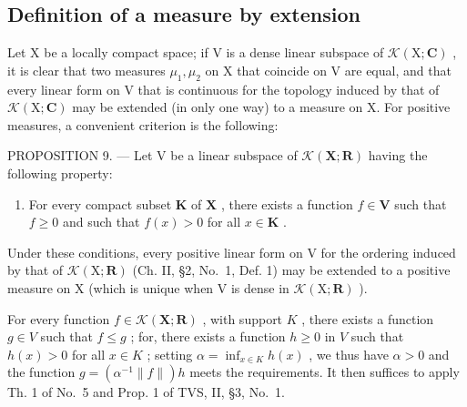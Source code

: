 \subsection{Definition of a measure by extension}

Let X be a locally compact space; if V is a dense linear subspace of \(\mathcal{K}(\mathrm{X};\mathbf{C})\) , it is clear that two measures \(\mu_{1}, \mu_{2}\) on X that coincide on V are equal, and that every linear form on V that is continuous for the topology induced by that of \(\mathcal{K}(\mathrm{X};\mathbf{C})\) may be extended (in only one way) to a measure on X. For positive measures, a convenient criterion is the following:

PROPOSITION 9. --- Let V be a linear subspace of \(\mathcal{K}(\mathbf{X};\mathbf{R})\) having the following property:

\begin{enumerate}
\def\labelenumi{(\Alph{enumi})}
\setcounter{enumi}{15}
\tightlist
\item
  For every compact subset \(\mathbf{K}\) of \(\mathbf{X}\) , there exists a function \(f \in \mathbf{V}\) such that \(f \geqslant 0\) and such that \(f(x) > 0\) for all \(x \in \mathbf{K}\) .
\end{enumerate}

Under these conditions, every positive linear form on V for the ordering induced by that of \(\mathcal{K}(\mathrm{X};\mathbf{R})\) (Ch. II, §2, No.~1, Def. 1) may be extended to a positive measure on X (which is unique when V is dense in \(\mathcal{K}(\mathrm{X};\mathbf{R})\) ).

For every function \(f \in \mathcal{K}(\mathbf{X};\mathbf{R})\) , with support \(K\) , there exists a function \(g \in V\) such that \(f \leqslant g\) ; for, there exists a function \(h \geqslant 0\) in \(V\) such that \(h(x) > 0\) for all \(x \in K\) ; setting \(\alpha = \inf_{x \in K} h(x)\) , we thus have \(\alpha > 0\) and the function \(g = (\alpha^{-1} \|f\|)h\) meets the requirements. It then suffices to apply Th. 1 of No.~5 and Prop. 1 of TVS, II, §3, No.~1.

